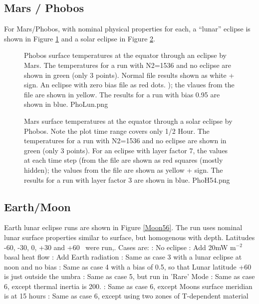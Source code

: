 \documentclass{article}
\begin{document}
\clearpage
\subsection{Mars / Phobos}

For Mars/Phobos, with nominal physical properties for each, a ``lunar'' eclipse is
shown in Figure \ref{PhoLun} and a solar eclipse in Figure \ref{PhoH54}.
 
\begin{figure}[!ht] 
\caption[Phobos lunar eclipse]{Phobos surface temperatures at the equator
    through an eclipse by Mars.  The temperatures for a run with N2=1536 and no
    eclipse are shown in green (only 3 points). Normal  file results
    shown as white + sign. An eclipse with zero bias  file as red
    dots. ); the vlaues from the  file are shown in yellow. The
    results for a run with bias 0.95 are shown in blue.
\label{PhoLun}  PhoLun.png }
\end{figure} 

\begin{figure}[!ht] 
\caption[Phobos solar eclipse]{Mars surface temperatures at the equator through
  a solar eclipse by Phobos. Note the plot time range covers only 1/2 Hour. The
  temperatures for a run with N2=1536 and no eclipse are shown in green (only 3
  points). For an eclipse with layer factor 7, the values at each time step
  (from the  file are shown as red squares (mostly hidden); the values
  from the  file are shown as yellow + sign. The results for a run
  with layer factor 3 are shown in blue.
\label{PhoH54}  PhoH54.png }
\end{figure} 

\clearpage

\subsection{Earth/Moon}

 Earth lunar eclipse runs are shown in Figure \ref{Moon56}. The run uses nominal lunar surface properties similar to  surface, but homogenous with depth. Latitudes -60, -30, 0, +30 and +60\qd~ were run,.  Cases are:
: No eclipse
: Add 20mW m$^{-2}$ basal heat flow
: Add Earth radiation
: Same as case 3 with a lunar eclipse at noon and no bias
: Same as case 4 with a bias of 0.5, so that Lunar latitude +60 is just outside the umbra
: Same as case 5, but run in 'Rare' Mode
: Same as case 6, except thermal inertia is 200.
: Same as case 6, except Moons surface meridian is at 15 hours
: Same as case 6, except using two zones of T-dependent material
\end{document}
